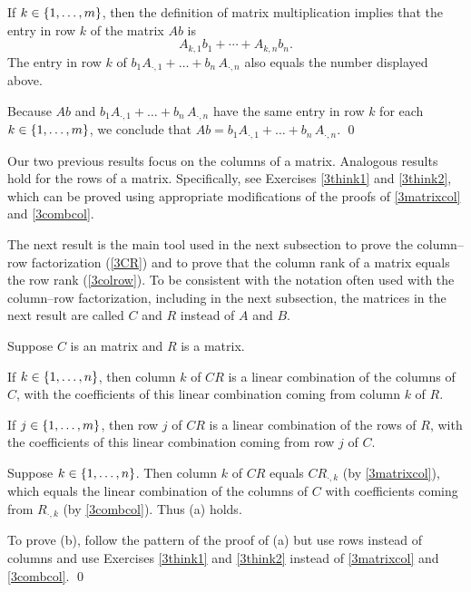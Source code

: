 \proof
If $k \in \{1, \ldots, m\}$, then the definition of matrix multiplication implies that the entry in row $k$ of the  matrix $Ab$ is
\[
A_{k, 1} b_1 + \cdots + A_{k,n} b_n.
\]
The entry in row $k$ of $b_1 A_{\cdot, 1} + \dots + b_n \, A_{\cdot, n}$ also equals the number displayed above.

Because $Ab$ and $b_1 A_{\cdot, 1} + \dots + b_n \, A_{\cdot, n}$ have the same entry in row $k$ for each $k \in \{1, \ldots, m\}$, we conclude that $Ab = b_1 A_{\cdot, 1} + \dots + b_n \, A_{\cdot, n}$.
\qed

Our two previous results focus on the columns of a matrix. Analogous results hold for the rows of a matrix. Specifically, see Exercises \ref{3think1} and \ref{3think2}, which can be proved using appropriate modifications of the proofs of \ref{3matrixcol} and \ref{3combcol}.

The next result is the main tool used in the next subsection to prove the column--row factorization (\ref{3CR}) and to prove that the column rank of a matrix equals the row rank (\ref{3colrow}). To be consistent with the notation often used with the column--row factorization, including in the next subsection, the matrices in the next result are called $C$ and $R$ instead of $A$ and $B$.

{Suppose $C$ is an  matrix and $R$ is a  matrix.
\begin{subtheorem}
\item
If $k \in \{1, \ldots, n\}$, then column $k$ of $CR$ is a linear combination of the columns of $C$, with the coefficients of this linear combination coming from column $k$ of $R$.
\item
If $j \in \{1, \ldots, m\}$, then row $j$ of $CR$ is a linear combination of the rows of $R$, with the coefficients of this linear combination coming from row $j$ of $C$.
\end{subtheorem}}

\proof
Suppose $k \in \{1, \ldots, n\}$. Then column $k$ of $CR$ equals $CR_{\cdot, k}$ (by \ref{3matrixcol}), which equals the linear combination of the columns of $C$ with coefficients coming from $R_{\cdot, k}$ (by \ref{3combcol}). Thus (a) holds.

To prove (b), follow the pattern of the proof of (a) but use rows instead of columns and use Exercises \ref{3think1} and \ref{3think2} instead of \ref{3matrixcol} and \ref{3combcol}.
\qed

